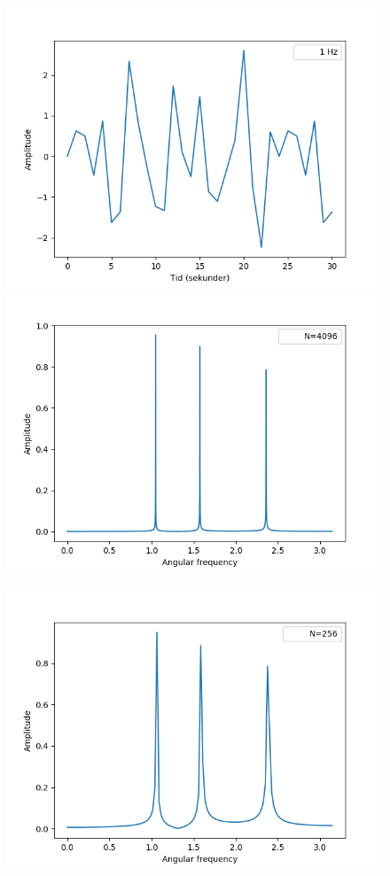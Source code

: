\begin{figure}
\begin{minipage}{0.49\textwidth}
\includegraphics[width=\textwidth]{figures/signal_1hz.png}
\includegraphics[width=\textwidth]{figures/frekvensanalyse/1hz_freq2}
\end{minipage}
\begin{minipage}{0.49\textwidth}
\includegraphics[width=\textwidth]{figures/frekvensanalyse/1hz_freq1.png}

\end{minipage}
\end{figure}
